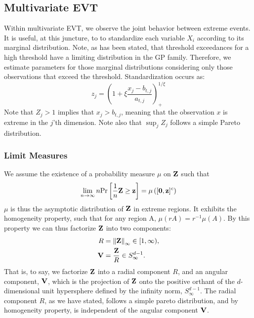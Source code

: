 \subsection{Multivariate EVT}

Within multivariate EVT, we observe the joint behavior between extreme events.
  It is useful, at this juncture, to to standardize each variable $X_i$
  according to its marginal distribution.  Note, as has been stated, that
  threshold exceedances for a high threshold have a limiting distribution in the
  GP family.  Therefore, we estimate parameters for those marginal distributions
  considering only those observations that exceed the threshold.
  Standardization occurs as:
\begin{equation}
    z_j = \left(1 + \xi\frac{x_j - b_{t,j}}{a_{t,j}}\right)_{+}^{1/\xi}
\end{equation}
Note that $Z_j > 1$ implies that $x_j > b_{t,j}$, meaning that the observation
  $x$ is extreme in the $j$'th dimension.  Note also that $\sup_j Z_j$ follows a
  simple Pareto distribution.

\subsubsection{Limit Measures}
We assume the existence of a probability measure $\mu$ on ${\bf Z}$ such that
\begin{equation}
\lim_{n\rightarrow\infty}n\text{Pr}\left[\frac{1}{n}{\bf Z} \geq {\bf z}\right] = \mu\left([{\bf 0}, {\bf z}]^c\right)
\label{eq:standard}
\end{equation}
$\mu$ is thus the asymptotic distribution of ${\bf Z}$ in extreme regions.  It
  exhibits the homogeneity property, such that for any region A,
  $\mu(rA) = r^{-1}\mu(A)$.  By this property we can thus factorize ${\bf Z}$
  into two components:
\begin{equation}
  \begin{aligned}
    R &= \left\lVert {\bf Z} \right\rVert_{\infty} \in [1, \infty),\\
    {\bf V} &= \frac{{\bf Z}}{R} \in S_{\infty}^{d-1}.
  \end{aligned}
\end{equation}
That is, to say, we factorize ${\bf Z}$ into a radial component $R$, and an
  angular component, ${\bf V}$, which is the projection of ${\bf Z}$ onto the
  positive orthant of the $d$-dimensional unit hypersphere defined by the
  infinity norm, $S_{\infty}^{d-1}$. The radial component $R$, as we have
  stated, follows a simple pareto distribution, and by homogeneity property, is
  independent of the angular component ${\bf V}$.

